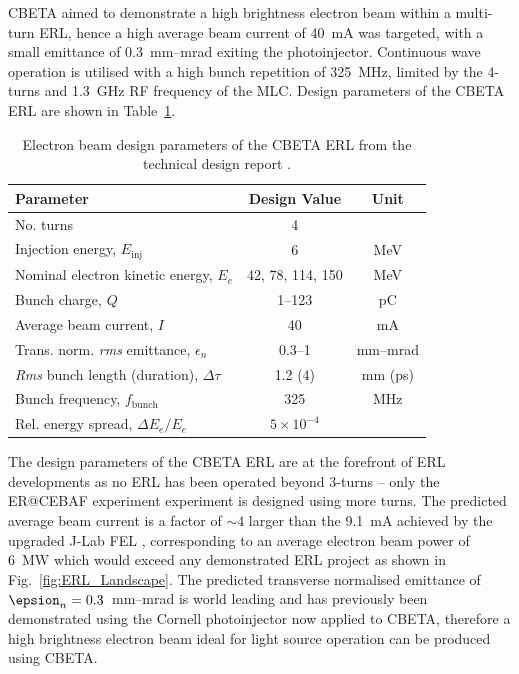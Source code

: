 \documentclass[../main.tex]{subfiles}
\begin{document}
CBETA aimed to demonstrate a high brightness electron beam within a multi-turn ERL, hence a high average beam current of 40~\si{\milli\ampere} was targeted, with a small emittance of 0.3~\si{\milli\meter}--\si{\milli\radian} exiting the photoinjector. Continuous wave operation is utilised with a high bunch repetition of 325~\si{\mega\hertz}, limited by the 4-turns and 1.3~\si{\giga\hertz} RF frequency of the MLC. Design parameters of the CBETA ERL \cite{hoffstaetter2017cbeta} are shown in Table~\ref{tab:CBETA_ERL_design_parameters}.

\begin{table}[!h]
\centering
\caption{Electron beam design parameters of the CBETA ERL from the technical design report \cite{hoffstaetter2017cbeta}.}
\vspace{3mm}
\begin{tabular}{lcc}
\hline\hline
Parameter & Design Value & Unit \\
\hline
No. turns & 4 & \\
Injection energy, $E_{\mathrm{inj}}$ & 6 & \si{\mega\electronvolt} \\
Nominal electron kinetic energy, $E_{e}$ & 42, 78, 114, 150 & \si{\mega\electronvolt} \\
Bunch charge, $Q$ & 1--123 & \si{\pico\coulomb} \\
Average beam current, $I$ & 40 & \si{\milli\ampere} \\
Trans. norm. \textit{rms} emittance, $\epsilon_{n}$ & 0.3--1 & \si{\milli\meter}--\si{\milli\radian} \\
\textit{Rms} bunch length (duration), $\Delta\tau$ & 1.2 (4) & \si{\milli\meter} (\si{\pico\second}) \\
Bunch frequency, $f_{\mathrm{bunch}}$ & 325 & \si{\mega\hertz} \\
Rel. energy spread, $\Delta E_{e}/E_{e}$ & $5\times 10^{-4}$ & \\
\hline
\end{tabular}
\label{tab:CBETA_ERL_design_parameters}
\end{table}

The design parameters of the CBETA ERL are at the forefront of ERL developments as no ERL has been operated beyond 3-turns \cite{gavrilov2007status,adolphsen2022european} -- only the ER@CEBAF experiment \cite{bogacz2016er,meot2016er} experiment is designed using more turns. The predicted average beam current is a factor of $\sim4$ larger than the 9.1~\si{\milli\ampere} achieved by the upgraded J-Lab FEL \cite{neil2006jlab}, corresponding to an average electron beam power of 6~\si{\mega\watt} which would exceed any demonstrated ERL project as shown in Fig.~\ref{fig:ERL_Landscape}. The predicted transverse normalised emittance of $\epsion_{n} = 0.3$~\si{\milli\meter}--\si{\milli\radian} is world leading and has previously been demonstrated using the Cornell photoinjector \cite{bartnik2015operational} now applied to CBETA, therefore a high brightness electron beam ideal for light source operation can be produced using CBETA.  
\end{document}
